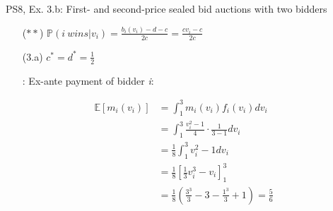 \begin{frame}{PS8, Ex. 3.b: First- and second-price sealed bid auctions with two bidders}
\begin{multicols}{2}
\begin{itemize}
        \item[($**$)] $\mathbb{P}(i\ wins|v_i)=\frac{b_i(v_i)-d-c}{2c}=\frac{cv_i-c}{2c}$
        \item[(3.a)]    $c^*=d^*=\frac{1}{2}$
        \item[\nth{2}:] Ex-ante payment of bidder \textit{i}:
      \end{itemize}
      \vspace{-12pt}
      \begin{align*}
        \mathbb{E}[m_i(v_i)]&=\textstyle\int_1^3m_i(v_i)f_i(v_i)dv_i\\
                            &=\textstyle\int_1^3\frac{v_i^2-1}{4}\cdot\frac{1}{3-1}dv_i\\
                            &=\frac{1}{8}\textstyle\int_1^3v_i^2-1dv_i\\
                            &=\frac{1}{8}\left[\frac{1}{3}v_i^3-v_i\right]_1^3\\
                            &=\frac{1}{8}\left(\frac{3^3}{3}-3-\frac{1^3}{3}+1\right)=\frac{5}{6}
      \end{align*}
      \vfill\null
    \end{multicols}
\end{frame}
